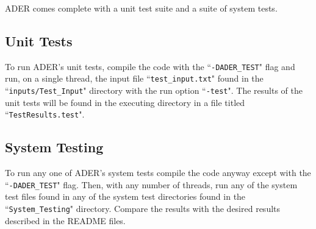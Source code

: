ADER comes complete with a unit test suite and a suite of system tests.

\subsection{Unit Tests}\label{ssec:unit_tests}
To run ADER's unit tests, compile the code with the ``\texttt{-DADER\_TEST}" 
flag and run, on a single thread, the input file ``\texttt{test\_input.txt}" 
found in the ``\texttt{inputs/Test\_Input}" directory with the run option
``\texttt{-test}". The results of the unit tests will be found in the executing
directory in a file titled ``\texttt{TestResults.test}".

\subsection{System Testing}\label{sssec:system_testing}
To run any one of ADER's system tests compile the code anyway except with the
``\texttt{-DADER\_TEST}" flag. Then, with any number of threads, run any of the
system test files found in any of the system test directories found in the 
``\texttt{System\_Testing}" directory. Compare the results with the desired
results described in the README files.
